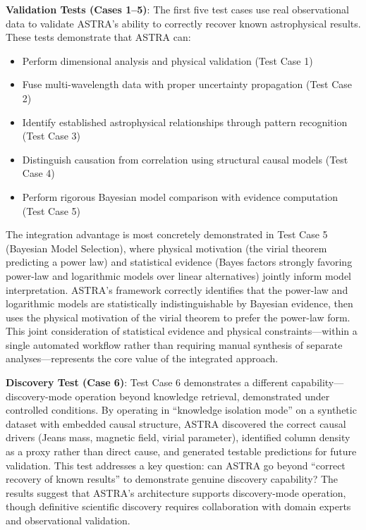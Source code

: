 \documentclass[usenatbib]{rasti}
\begin{document}
\textbf{Validation Tests (Cases 1--5)}: The first five test cases use real observational data to validate ASTRA's ability to correctly recover known astrophysical results. These tests demonstrate that ASTRA can:
\begin{itemize}
\item Perform dimensional analysis and physical validation (Test Case 1)
\item Fuse multi-wavelength data with proper uncertainty propagation (Test Case 2)
\item Identify established astrophysical relationships through pattern recognition (Test Case 3)
\item Distinguish causation from correlation using structural causal models (Test Case 4)
\item Perform rigorous Bayesian model comparison with evidence computation (Test Case 5)
\end{itemize}

The integration advantage is most concretely demonstrated in Test Case 5 (Bayesian Model Selection), where physical motivation (the virial theorem predicting a power law) and statistical evidence (Bayes factors strongly favoring power-law and logarithmic models over linear alternatives) jointly inform model interpretation. ASTRA's framework correctly identifies that the power-law and logarithmic models are statistically indistinguishable by Bayesian evidence, then uses the physical motivation of the virial theorem to prefer the power-law form. This joint consideration of statistical evidence and physical constraints---within a single automated workflow rather than requiring manual synthesis of separate analyses---represents the core value of the integrated approach.

\textbf{Discovery Test (Case 6)}: Test Case 6 demonstrates a different capability---discovery-mode operation beyond knowledge retrieval, demonstrated under controlled conditions. By operating in ``knowledge isolation mode'' on a synthetic dataset with embedded causal structure, ASTRA discovered the correct causal drivers (Jeans mass, magnetic field, virial parameter), identified column density as a proxy rather than direct cause, and generated testable predictions for future validation. This test addresses a key question: can ASTRA go beyond ``correct recovery of known results'' to demonstrate genuine discovery capability? The results suggest that ASTRA's architecture supports discovery-mode operation, though definitive scientific discovery requires collaboration with domain experts and observational validation.
\end{document}

